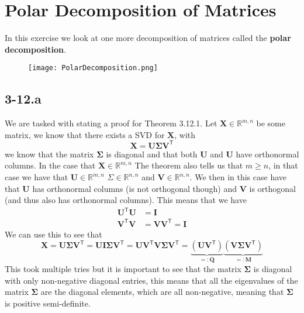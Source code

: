 \documentclass{article}
\begin{document}
\section*{Polar Decomposition of Matrices}
In this exercise we look at one more decomposition of matrices called the \textbf{polar decomposition}.

\begin{figure}[!hbt]
    \centering
\texttt{[image: PolarDecomposition.png]}
\end{figure}

\subsection*{3-12.a}
We are tasked with stating a proof for Theorem 3.12.1. Let $\mathbf{X}\in \mathbb{R}^{m,n}$ be some matrix, we know that there exists a SVD for $\mathbf{X}$, with
\begin{equation*}
    \mathbf{X} = \mathbf{U}\mathbf{\Sigma}\mathbf{V}^{\mathsf{T}}
\end{equation*}
we know that the matrix $\mathbf{\Sigma}$ is diagonal and that both $\mathbf{U}$ and $\mathbf{U}$ have orthonormal columns. In the case that $\mathbf{X}\in \mathbb{R}^{m,n}$ The theorem also tells us that $m \geq n$, in that case we have that $\mathbf{U}\in \mathbb{R}^{m,n}$ $\Sigma \in \mathbb{R}^{n,n}$ and $\mathbf{V}\in \mathbb{R}^{n,n}$. We then in this case have that $\mathbf{U}$ has orthonormal columns (is not orthogonal though) and $\mathbf{V}$ is orthogonal (and thus also has orthonormal columns). This means that we have
\begin{align*}
    \mathbf{U}^{\mathsf{T}}\mathbf{U} &= \mathbf{I} \\
    \mathbf{V}^{\mathsf{T}}\mathbf{V}& = \mathbf{V}\mathbf{V}^{\mathsf{T}} = \mathbf{I}
\end{align*}
We can use this to see that
\begin{equation*}
    \mathbf{X} = \mathbf{U}\mathbf{\Sigma}\mathbf{V}^{\mathsf{T}} = \mathbf{U}\mathbf{I}\mathbf{\Sigma}\mathbf{V}^{\mathsf{T}} = \mathbf{U}\mathbf{V}^{\mathsf{T}}\mathbf{V}\mathbf{\Sigma}\mathbf{V}^{\mathsf{T}} = \underbrace{\left(\mathbf{U}\mathbf{V}^{\mathsf{T}}\right)}_{=: \mathbf{Q}}\underbrace{\left(\mathbf{V}\mathbf{\Sigma}\mathbf{V}^{\mathsf{T}} \right)}_{=: \mathbf{M}}
\end{equation*}
This took multiple tries but it is important to see that the matrix $\mathbf{\Sigma}$ is diagonal with only non-negative diagonal entries, this means that all the eigenvalues of the matrix $\mathbf{\Sigma}$ are the diagonal elements, which are all non-negative, meaning that $\mathbf{\Sigma}$ is positive semi-definite. 
\end{document}
